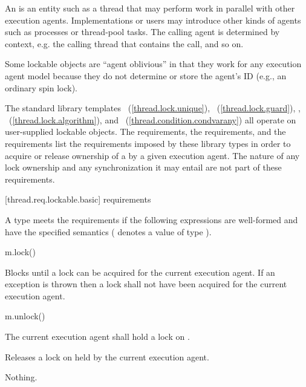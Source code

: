 \pnum
An  is an entity such as a thread that may perform work in parallel with
other execution agents. \enternote Implementations or users may introduce other kinds of
agents such as processes or thread-pool tasks. \exitnote The calling agent is determined by
context, e.g. the calling thread that contains the call, and so on.

\pnum
\enternote Some lockable objects are ``agent oblivious'' in that they work for any
execution agent model because they do not determine or store the agent's ID (e.g., an
ordinary spin lock). \exitnote

\pnum
The standard library templates ~(\ref{thread.lock.unique}),
~(\ref{thread.lock.guard}), ,
~(\ref{thread.lock.algorithm}), and
~(\ref{thread.condition.condvarany}) all operate on user-supplied
lockable objects. The  requirements, the  requirements,
and the  requirements list the requirements imposed by these library types
in order to acquire or release ownership of a  by a given execution agent.
\enternote The nature of any lock ownership and any synchronization it may entail are not part
of these requirements. \exitnote

[thread.req.lockable.basic]{ requirements}

\pnum
A type  meets the  requirements if the following expressions are
well-formed and have the specified semantics ( denotes a value of type ).

\begin{itemdecl}
m.lock()
\end{itemdecl}

\begin{itemdescr}
\pnum
\effects Blocks until a lock can be acquired for the current execution agent. If an exception
is thrown then a lock shall not have been acquired for the current execution agent.
\end{itemdescr}

\begin{itemdecl}
m.unlock()
\end{itemdecl}

\begin{itemdescr}
\pnum
\requires The current execution agent shall hold a lock on .

\pnum
\effects Releases a lock on  held by the current execution agent.

\pnum
\throws Nothing.
\end{itemdescr}

